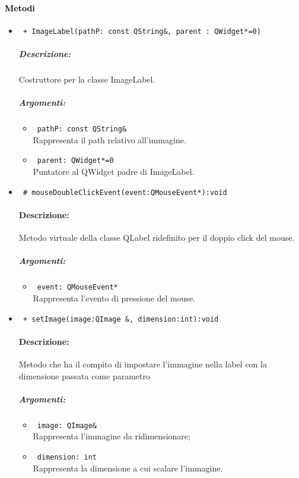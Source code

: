 \paragraph{\textcolor{black}{Metodi\\}}
\begin{itemize}
\item \color{blue}\verb! + ImageLabel(pathP: const QString&, parent : QWidget*=0)!
\color{black}
\subparagraph{Descrizione: }
Costruttore per la classe ImageLabel.
\subparagraph{Argomenti:}
\begin{itemize}
\item \color{RoyalPurple} \verb! pathP: const QString& ! \\ Rappresenta il path relativo all'immagine.
\item  \color{RoyalPurple} \verb! parent: QWidget*=0 ! \\ Puntatore al QWidget padre di ImageLabel.
\end{itemize}

\item \color{blue}\verb! # mouseDoubleClickEvent(event:QMouseEvent*):void!
\color{black}
\paragraph{Descrizione:} Metodo virtuale della classe QLabel ridefinito per il doppio click del mouse.
\subparagraph{Argomenti:}
\begin{itemize}
\item \color{RoyalPurple} \verb! event: QMouseEvent*! \\ Rappresenta l'evento di pressione del mouse.
\end{itemize}

\item \color{blue}\verb! + setImage(image:QImage &, dimension:int):void!
\color{black}
\paragraph{Descrizione:} Metodo che ha il compito di impostare l'immagine nella label con la dimensione passata come parametro
\subparagraph{Argomenti:}
\begin{itemize}
\item \color{RoyalPurple} \verb! image: QImage& ! \\ Rappresenta l'immagine da ridimensionare;
\item \color{RoyalPurple} \verb! dimension: int! \\ Rappresenta la dimensione a cui scalare l'immagine.
\end{itemize}


\end{itemize}
